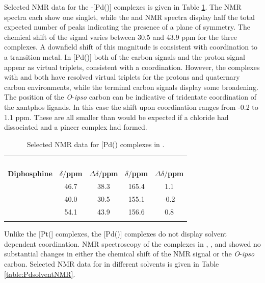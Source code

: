 Selected NMR data for the \trans-[Pd(\tBuxantphos)] complexes is given in Table \ref{table:PdClNMR}.  The \phosphorus{} NMR spectra each show one singlet, while the \proton{} and \carbon{} NMR spectra display half the total expected number of peaks indicating the presence of a plane of symmetry.  The chemical shift of the \phosphorus{} signal varies between 30.5 and 43.9 ppm for the three complexes.  A downfield shift of this magnitude is consistent with coordination to a transition metal.\cite{Pregosin2012}  In [Pd(\tBuxantphos)] both of the \tBu{} carbon signals and the proton signal appear as virtual triplets, consistent with a \trans{} coordination.  However, the complexes with \tBusixantphos{} and \tButhixantphos{} both have resolved virtual triplets for the \tBu{} protons and quaternary carbon environments, while the terminal carbon signals display some broadening.  The position of the \emph{O}-\emph{ipso} carbon can be indicative of tridentate coordination of the xantphos ligands.  In this case the shift upon coordination ranges from -0.2 to 1.1 ppm.  These are all smaller than would be expected if a chloride had dissociated and a pincer complex had formed.  

\begin{table}[htbp]
\caption[Selected NMR data for [Pd(\tBuxantphos)\ce{Cl2}{]} complexes]{Selected NMR data for [Pd(\tBuxantphos)\ce{Cl2}{]} complexes in .}
\label{table:PdClNMR}
\small
\begin{center}
\begin{tabular}{l c c c c}
	\toprule{}
	~~ & \multicolumn{2}{c}{\bfseries{\phosphorus}} & \multicolumn{2}{c}{\bfseries{\carbon}}\\
	\cmidrule(lr){2-3} \cmidrule(lr){4-5}
	\bfseries{Diphosphine}&\bfseries{$\delta/$ppm}&\bfseries{$\Delta\delta/$ppm}& \bfseries{$\delta/$ppm} & \bfseries{$\Delta\delta/$ppm}\\
	\midrule
	\tBuSixantphos 		& 46.7	& 38.3	& 165.4	& 1.1 \\
	\tBuThixantphos	& 40.0	& 30.5	& 155.1	& -0.2 \\
	\tBuXantphos		& 54.1	& 43.9	& 156.6	& 0.8	 \\
	\bottomrule{}
\end{tabular}
\end{center}
\end{table}

Unlike the [Pt(\tBuxantphos{}] complexes, the [Pd(\tBuxantphos)] complexes do not display solvent dependent coordination.  NMR spectroscopy of the complexes in , , and  showed no substantial changes in either the chemical shift of the \phosphorus{} NMR signal or the \emph{O}-\emph{ipso} carbon.  Selected NMR data for \tBusixantphos{} in different solvents is given in Table \ref{table:PdsolventNMR}.

